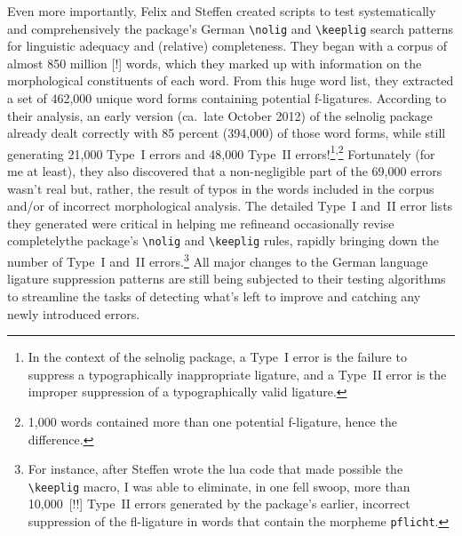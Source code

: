 \documentclass[11pt]{article}
\newcommand{\pkg}[1]{\textsf{#1}}
\newcommand{\opt}[1]{\texttt{#1}}
\newcommand{\cmmd}[1]{\texttt{\textbackslash #1}}
\begin{document}
Even more importantly, Felix and Steffen created scripts to test systematically and comprehensively the package's German \cmmd{nolig} and \cmmd{keeplig} search patterns for linguistic adequacy and (relative) completeness.
They began with a corpus of almost 850 million [!] words, which they marked up with information on the morphological constituents of each word. From this huge word list, they extracted a set of 462,000 unique word forms containing potential f-ligatures.
According to their analysis, an early version (ca.\ late October 2012) of the \pkg{selnolig} package already dealt correctly with 85 percent (394,000) of those word forms, while still generating 21,000 Type~I errors and 48,000 Type~II errors!\footnote{In the context of the \pkg{selnolig} package, a Type~I error is the failure to suppress a typographically inappropriate ligature, and a Type~II error is the improper suppression of a typographically valid ligature.}\textsuperscript{,}\footnote{1,000 words contained more than one potential f-ligature, hence the difference.} 
Fortunately (for me at least), they also discovered that a non-negligible part of the 69,000 errors wasn't real but, rather, the result of typos in the words included in the corpus and/or of incorrect morphological analysis. The detailed Type~I and~II error lists they generated were critical in helping me refine\textemdash and occasionally revise completely\textemdash the package's \cmmd{nolig} and \cmmd{keeplig} rules, rapidly bringing down the number of Type~I and~II errors.\footnote{For instance, after Steffen wrote the lua code that made possible the \cmmd{keeplig} macro, I was able to eliminate, in one fell swoop, more than 10,000~[!!] Type~II errors generated by the package's earlier, incorrect suppression of the fl-ligature in words that contain the morpheme \opt{pflicht}. } All major changes to the German language ligature suppression patterns are still being subjected to their testing algorithms to streamline the tasks of detecting what's left to improve and catching any newly introduced errors.
\end{document}
